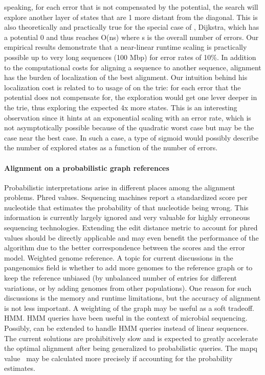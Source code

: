 speaking, for each error that is not compensated by the potential, the \A search
will explore another layer of states that are 1 more distant from the diagonal.
This is also theoretically and practically true for the special case of \A,
Dijkstra, which has a potential 0 and thus reaches O(ns) where s is the overall
number of errors. Our empirical results demonstrate that a near-linear runtime
scaling is practically possible up to very long sequences (100 Mbp) for error
rates of 10\%. In addition to the computational costs for aligning a sequence to
another sequence, alignment has the burden of localization of the best
alignment. Our intuition behind his localization cost is related to to usage of
\A on the trie: for each error that the \A potential does not compensate for,
the exploration would get one lever deeper in the trie, thus exploring the
expected 4x more states. This is an interesting observation since it hints at an
exponential scaling with an error rate, which is not asymptotically possible
because of the quadratic worst case but may be the case near the best case. In
such a case, a type of sigmoid would possibly describe the number of explored
states as a function of the number of errors.

\paragraph{Alignment on a probabilistic graph references}
Probabilistic interpretations arise in different places among the alignment
problems. Phred values. Sequencing machines report a standardized score per
nucleotide that estimates the probability of that nucleotide being wrong. This
information is currently largely ignored and very valuable for highly erroneous
sequencing technologies. Extending the edit distance metric to account for phred
values should be directly applicable and may even benefit the performance of the
\A algorithm due to the better correspondence between the scores and the error
model. Weighted genome reference. A topic for current discussions in the
pangenomics field is whether to add more genomes to the reference graph or to
keep the reference unbiased (by unbalanced number of entries for different
variations, or by adding genomes from other populations). One reason for such
discussions is the memory and runtime limitations, but the accuracy of alignment
is not less important. A weighting of the graph may be useful as a soft
tradeoff. HMM. HMM queries have been useful in the context of microbial
sequencing. Possibly, \A can be extended to handle HMM queries instead of linear
sequences. The current solutions are prohibitively slow and \astarix is expected
to greatly accelerate the optimal alignment after being generalized to
probabilistic queries. The mapq value~\citep{li2008mapping} may be calculated
more precisely if accounting for the probability estimates.

